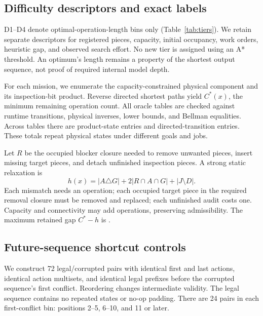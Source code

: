 \documentclass[10pt,twocolumn,letterpaper]{article}
\begin{document}
\begin{table}[t]
\centering\small
\caption{Operation-length strata and measured descriptors. D1--D4 are
predetermined length bins (1--8, 9--16, 17--24, 25+), not cognitive-depth
levels. Gap is exact cost minus the static lower bound.}
\resizebox{\columnwidth}{!}{}
\label{tab:tiers}
\end{table}

\subsection{Difficulty descriptors and exact labels}
D1--D4 denote optimal-operation-length bins only
(Table~\ref{tab:tiers}). We retain separate descriptors for registered
pieces, capacity, initial occupancy, work orders, heuristic gap, and
observed search effort. No new tier is assigned using an A* threshold.
An optimum's length remains a property of the shortest output sequence,
not proof of required internal model depth.

For each mission, we enumerate the capacity-constrained physical
component and its inspection-bit product. Reverse directed shortest
paths yield $C^*(x)$, the minimum remaining operation count.
All \OracleCount{} oracle tables are checked against runtime transitions,
physical inverses, lower bounds, and Bellman equalities.
Across tables there are \ProductCount{} product-state entries and
\EdgeCount{} directed-transition entries. These totals repeat physical
states under different goals and jobs.

Let $R$ be the occupied blocker closure needed to remove unwanted pieces,
insert missing target pieces, and detach unfinished inspection pieces.
A strong static relaxation is
\begin{equation}
 h(x)=|A\triangle G|+2|R\cap A\cap G|+|J\setminus D|.
 \label{eq:bound}
\end{equation}
Each mismatch needs an operation; each occupied target piece in the
required removal closure must be removed and replaced; each unfinished
audit costs one. Capacity and connectivity may add operations, preserving
admissibility. The maximum retained gap $C^*-h$ is \MaxGap{}.

\subsection{Future-sequence shortcut controls}
We construct 72 legal/corrupted pairs with identical first and last
actions, identical action multisets, and identical legal prefixes before
the corrupted sequence's first conflict. Reordering changes intermediate
validity. The legal sequence contains no repeated states or no-op padding.
There are 24 pairs in each first-conflict bin: positions 2--5, 6--10,
and 11 or later.
\end{document}
